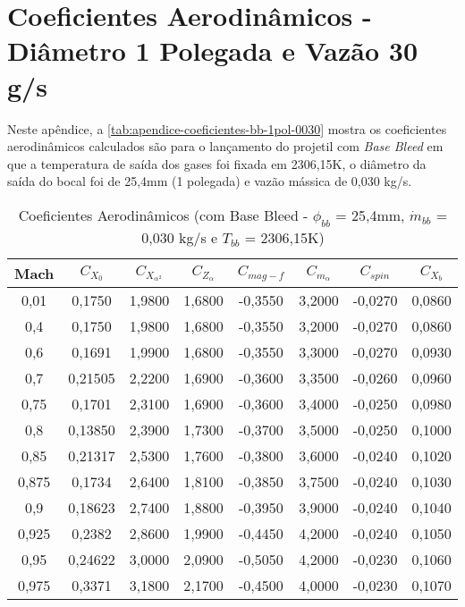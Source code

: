 \chapter{Coeficientes Aerodinâmicos - Diâmetro 1 Polegada e Vazão 30 g/s}

Neste apêndice, a \autoref{tab:apendice-coeficientes-bb-1pol-0030} mostra os coeficientes aerodinâmicos calculados são para o lançamento do projetil com \textit{Base Bleed} em que a temperatura de saída dos gases foi fixada em 2306,15K, o diâmetro da saída do bocal foi de 25,4mm (1 polegada) e vazão mássica de 0,030 kg/s.

\begin{table}[ht]
\centering
\caption[Coeficientes Aerodinâmicos (com Base Bleed - $\phi_{bb}$ = 25,4mm, $\Dot{m}_{bb}$ = 0,030 kg/s e $T_{bb}$ = 2306,15K)]{Coeficientes Aerodinâmicos  (com Base Bleed - $\phi_{bb}$ = 25,4mm, $\Dot{m}_{bb}$ = 0,030 kg/s e $T_{bb}$ = 2306,15K)}
\vspace{0.5cm}
\begin{tabular}{c|c|c|c|c|c|c|c}
    Mach & \(C_{X_0}\) & \(C_{X_{\alpha^2}}\) & \(C_{Z_\alpha}\) & \(C_{mag-f}\) & \(C_{m_{\alpha}}\) & \(C_{spin}\) & \(C_{X_b}\) \\\hline
0,01  & 0,1750  & 1,9800 & 1,6800 & -0,3550 & 3,2000 & -0,0270 & 0,0860 \\
0,4   & 0,1750  & 1,9800 & 1,6800 & -0,3550 & 3,2000 & -0,0270 & 0,0860 \\
0,6   & 0,1691  & 1,9900 & 1,6800 & -0,3550 & 3,3000 & -0,0270 & 0,0930 \\
0,7   & 0,21505 & 2,2200 & 1,6900 & -0,3600 & 3,3500 & -0,0260 & 0,0960 \\
0,75  & 0,1701  & 2,3100 & 1,6900 & -0,3600 & 3,4000 & -0,0250 & 0,0980 \\
0,8   & 0,13850 & 2,3900 & 1,7300 & -0,3700 & 3,5000 & -0,0250 & 0,1000 \\
0,85  & 0,21317 & 2,5300 & 1,7600 & -0,3800 & 3,6000 & -0,0240 & 0,1020 \\
0,875 & 0,1734  & 2,6400 & 1,8100 & -0,3850 & 3,7500 & -0,0240 & 0,1030 \\
0,9   & 0,18623 & 2,7400 & 1,8800 & -0,3950 & 3,9000 & -0,0240 & 0,1040 \\
0,925 & 0,2382  & 2,8600 & 1,9900 & -0,4450 & 4,2000 & -0,0240 & 0,1050 \\
0,95  & 0,24622 & 3,0000 & 2,0900 & -0,5050 & 4,2000 & -0,0230 & 0,1060 \\
0,975 & 0,3371  & 3,1800 & 2,1700 & -0,4500 & 4,0000 & -0,0230 & 0,1070 \\

\end{tabular}
\end{table}
